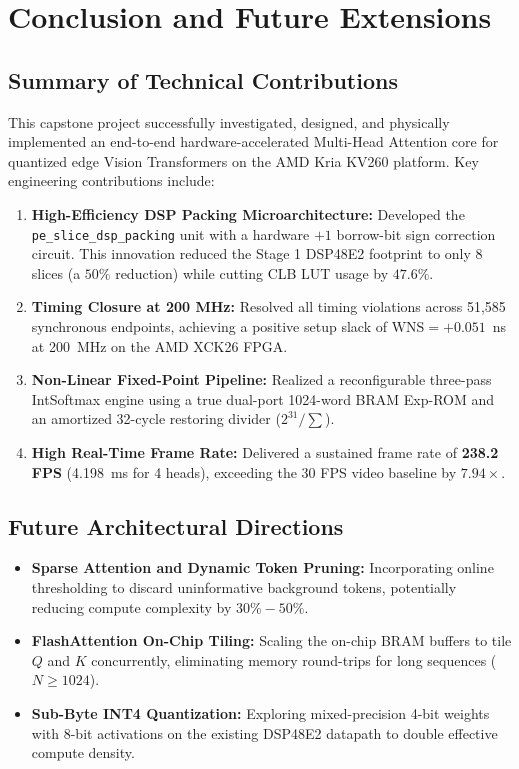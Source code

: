 \chapter{Conclusion and Future Extensions}
\label{chap:conclusion}

\section{Summary of Technical Contributions}
This capstone project successfully investigated, designed, and physically implemented an end-to-end hardware-accelerated Multi-Head Attention core for quantized edge Vision Transformers on the AMD Kria KV260 platform. Key engineering contributions include:

\begin{enumerate}
    \item \textbf{High-Efficiency DSP Packing Microarchitecture:} Developed the \texttt{pe\_slice\_dsp\_packing} unit with a hardware $+1$ borrow-bit sign correction circuit. This innovation reduced the Stage 1 DSP48E2 footprint to only 8 slices (a $50\%$ reduction) while cutting CLB LUT usage by $47.6\%$.
    \item \textbf{Timing Closure at 200 MHz:} Resolved all timing violations across 51,585 synchronous endpoints, achieving a positive setup slack of $\text{WNS} = +0.051$~ns at 200~MHz on the AMD XCK26 FPGA.
    \item \textbf{Non-Linear Fixed-Point Pipeline:} Realized a reconfigurable three-pass IntSoftmax engine using a true dual-port 1024-word BRAM Exp-ROM and an amortized 32-cycle restoring divider ($2^{31}/\sum$).
    \item \textbf{High Real-Time Frame Rate:} Delivered a sustained frame rate of \textbf{238.2 FPS} (4.198~ms for 4 heads), exceeding the 30 FPS video baseline by $7.94\times$.
\end{enumerate}

\section{Future Architectural Directions}
\begin{itemize}
    \item \textbf{Sparse Attention and Dynamic Token Pruning:} Incorporating online thresholding to discard uninformative background tokens, potentially reducing compute complexity by $30\% - 50\%$.
    \item \textbf{FlashAttention On-Chip Tiling:} Scaling the on-chip BRAM buffers to tile $Q$ and $K$ concurrently, eliminating memory round-trips for long sequences ($N \ge 1024$).
    \item \textbf{Sub-Byte INT4 Quantization:} Exploring mixed-precision 4-bit weights with 8-bit activations on the existing DSP48E2 datapath to double effective compute density.
\end{itemize}

